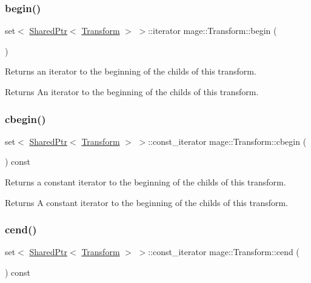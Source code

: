 \subsubsection{\texorpdfstring{begin()}{begin()}}
{\footnotesize\ttfamily set$<$ \hyperlink{namespacemage_a1e01ae66713838a7a67d30e44c67703e}{Shared\+Ptr}$<$ \hyperlink{structmage_1_1_transform}{Transform} $>$ $>$\+::iterator mage\+::\+Transform\+::begin (\begin{DoxyParamCaption}{ }\end{DoxyParamCaption})}

Returns an iterator to the beginning of the childs of this transform.

\begin{DoxyReturn}{Returns}
An iterator to the beginning of the childs of this transform. 
\end{DoxyReturn}
\hypertarget{structmage_1_1_transform_aeafb71be299fdb8aad68321ae0d957d6}{}\label{structmage_1_1_transform_aeafb71be299fdb8aad68321ae0d957d6} 
\subsubsection{\texorpdfstring{cbegin()}{cbegin()}}
{\footnotesize\ttfamily set$<$ \hyperlink{namespacemage_a1e01ae66713838a7a67d30e44c67703e}{Shared\+Ptr}$<$ \hyperlink{structmage_1_1_transform}{Transform} $>$ $>$\+::const\+\_\+iterator mage\+::\+Transform\+::cbegin (\begin{DoxyParamCaption}{ }\end{DoxyParamCaption}) const}

Returns a constant iterator to the beginning of the childs of this transform.

\begin{DoxyReturn}{Returns}
A constant iterator to the beginning of the childs of this transform. 
\end{DoxyReturn}
\hypertarget{structmage_1_1_transform_a9d021050eafdbaa7a19d6a7de49a9641}{}\label{structmage_1_1_transform_a9d021050eafdbaa7a19d6a7de49a9641} 
\subsubsection{\texorpdfstring{cend()}{cend()}}
{\footnotesize\ttfamily set$<$ \hyperlink{namespacemage_a1e01ae66713838a7a67d30e44c67703e}{Shared\+Ptr}$<$ \hyperlink{structmage_1_1_transform}{Transform} $>$ $>$\+::const\+\_\+iterator mage\+::\+Transform\+::cend (\begin{DoxyParamCaption}{ }\end{DoxyParamCaption}) const}

